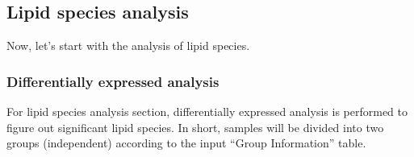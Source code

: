\documentclass[]{article}
\begin{document}
\hypertarget{lipid-species-analysis}{%
\subsection{Lipid species analysis}\label{lipid-species-analysis}}

Now, let's start with the analysis of lipid species.

\hypertarget{differentially-expressed-analysis}{%
\subsubsection{Differentially expressed analysis}\label{differentially-expressed-analysis}}

For lipid species analysis section, differentially expressed analysis is performed to figure out significant lipid species. In short, samples will be divided into two groups (independent) according to the input ``Group Information'' table.
\end{document}
